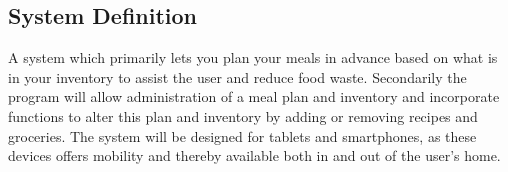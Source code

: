 \subsection{System Definition}
A system which primarily lets you plan your meals in advance based on what is in your inventory to assist the user and reduce food waste.
Secondarily the program will allow administration of a meal plan and inventory and incorporate functions to alter this plan and inventory by adding or removing recipes and groceries.
The system will be designed for tablets and smartphones, as these devices offers mobility and thereby available both in and out of the user's home.